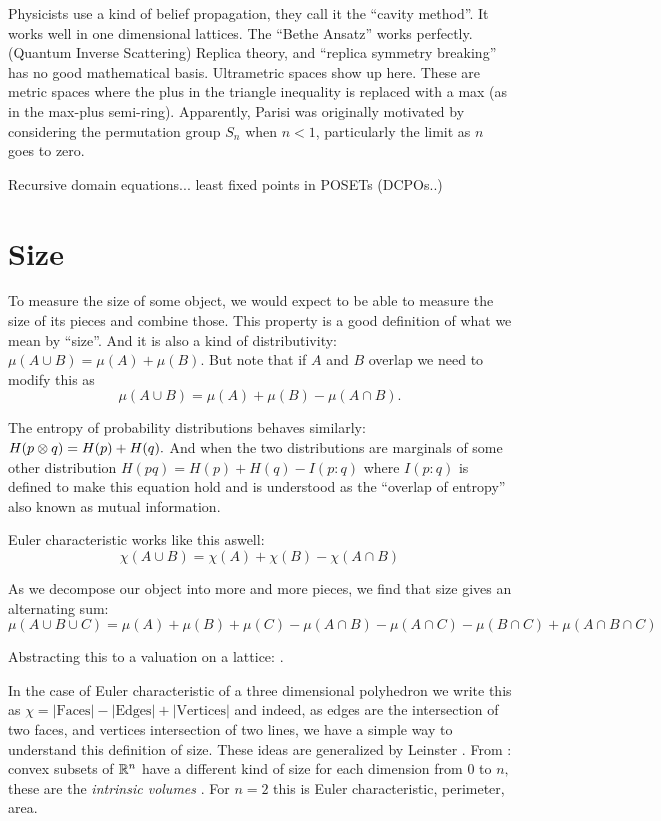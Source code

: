 \documentclass[11pt]{article}
\begin{document}
Physicists use a kind of belief propagation, they call it the ``cavity method''. 
It works well in one dimensional lattices. The ``Bethe Ansatz'' works perfectly.
(Quantum Inverse Scattering)
Replica theory, and ``replica symmetry breaking'' has no good mathematical basis.
Ultrametric spaces show up here. These are metric spaces where
the plus in the triangle inequality is replaced with a max (as in the max-plus semi-ring).
Apparently, Parisi was originally motivated by considering
the permutation group $S_n$ when $n<1$, particularly the limit as $n$ goes to zero.

Recursive domain equations... least fixed points in POSETs (DCPOs..)



\section{Size}

To measure the size of some object, we would
expect to be able to measure the size of its pieces
and combine those. 
This property is a good definition of what we
mean by ``size''. And it is also a kind of
distributivity: 
$\mu(A\cup B) = \mu(A) + \mu(B).$
But note that if $A$ and $B$ overlap we need to modify this
as
$$\mu(A\cup B) = \mu(A) + \mu(B) - \mu(A\cap B).$$

The entropy of probability distributions behaves similarly:
$H(p\otimes q) = H(p) + H(q).$
And when the two distributions are marginals of some other distribution
$H(pq) = H(p) + H(q) - I(p:q)$
where $I(p:q)$ is defined to make this equation hold and is
understood as the ``overlap of entropy'' also known as mutual information.

Euler characteristic works like this aswell:
$$
\chi(A\cup B) = \chi(A) + \chi(B) - \chi(A\cap B)
$$

As we decompose our object into more and more pieces,
we find that size gives an alternating sum:
$$
\mu(A\cup B\cup C) = \mu(A) + \mu(B) + \mu(C) 
    - \mu(A\cap B) - \mu(A\cap C) - \mu(B\cap C)
    + \mu(A\cap B \cap C)
$$

Abstracting this to a valuation on a lattice:
\cite{Klain1997}.

In the case of Euler characteristic of a three dimensional polyhedron
we write this as 
$\chi = |\mbox{Faces}| - |\mbox{Edges}| + |\mbox{Vertices}|$
and indeed, as edges are the intersection
of two faces, and vertices intersection of two lines,
we have a simple way to understand this definition of size.
These ideas are generalized by Leinster \cite{Leinster2008,Leinster2013,Leinster2014}.
From \cite{Leinster2014}: convex subsets of $\mathbb R^n$ have
a different kind of size for each dimension from $0$ to $n,$
these are the \emph{intrinsic volumes} \cite{Klain1997}.
For $n=2$ this is Euler characteristic, perimeter, area.
\end{document}
